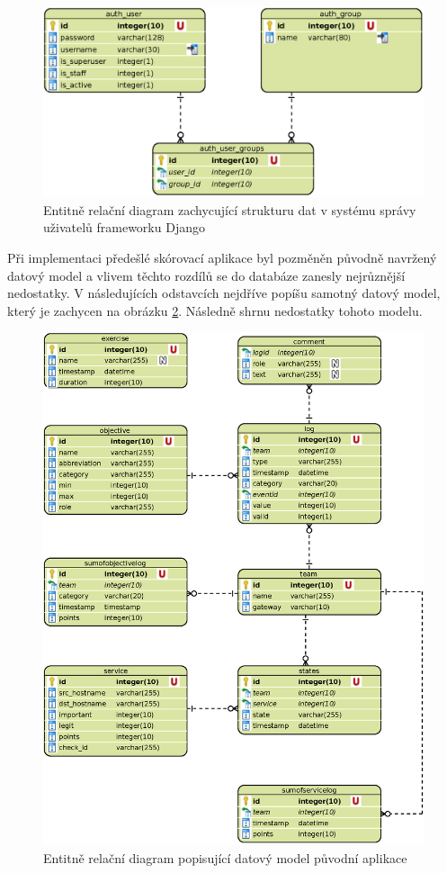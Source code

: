 \documentclass[
  digital, %
  twoside, %
  table,   %
  lof,     %
  lot,     %
]{fithesis3}
\begin{document}
\begin{figure}[h!]
    \centering
    \includegraphics[width=13cm]{images/ERD-django.eps}
    \caption{Entitně relační diagram zachycující strukturu dat v systému správy uživatelů frameworku Django}
    \label{fig:erdDjango}
\end{figure}

Při implementaci předešlé skórovací aplikace byl pozměněn původně navržený datový model a vlivem těchto rozdílů se do databáze zanesly nejrůznější nedostatky. V následujících odstavcích nejdříve popíšu samotný datový model, který je zachycen na obrázku \ref{fig:erdOldApp}. Následně shrnu nedostatky tohoto modelu. 

\begin{figure}[h!]
    \centering
    \includegraphics[width=13.5cm]{images/ERD-old-app.eps}
    \caption{Entitně relační diagram popisující datový model původní aplikace}
    \label{fig:erdOldApp}
\end{figure}
\end{document}
